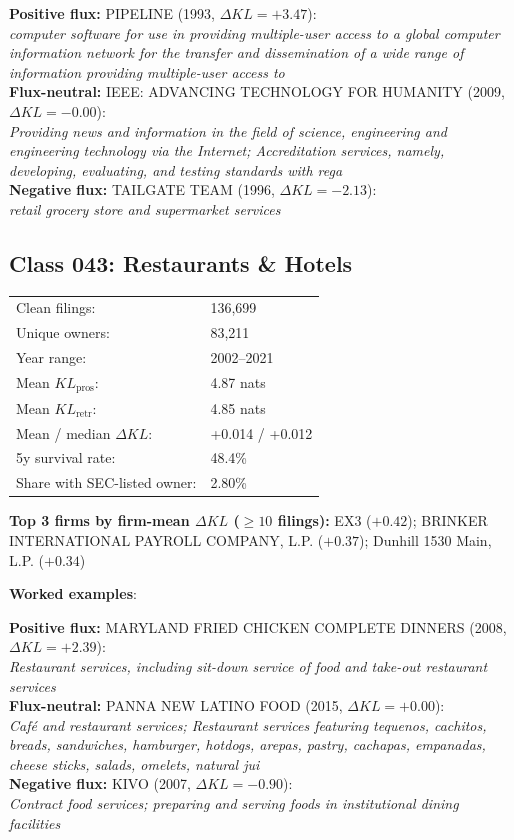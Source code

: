   \textbf{Positive flux:} \textsc{PIPELINE} (1993, $\Delta KL=+3.47$):\\
  \textit{computer software for use in providing multiple-user access to a global computer information network for the transfer and dissemination of a wide range of information providing multiple-user access to}\\
  \textbf{Flux-neutral:} \textsc{IEEE: ADVANCING TECHNOLOGY FOR HUMANITY} (2009, $\Delta KL=-0.00$):\\
  \textit{Providing news and information in the field of science, engineering and engineering technology via the Internet; Accreditation services, namely, developing, evaluating, and testing standards with rega}\\
  \textbf{Negative flux:} \textsc{TAILGATE TEAM} (1996, $\Delta KL=-2.13$):\\
  \textit{retail grocery store and supermarket services}\\

\subsection*{Class 043: Restaurants \& Hotels}
\label{app:industry-043}

\begin{tabular}{ll}
Clean filings: & 136,699 \\
Unique owners: & 83,211 \\
Year range: & 2002--2021 \\
Mean $KL_\text{pros}$: & 4.87 nats \\
Mean $KL_\text{retr}$: & 4.85 nats \\
Mean / median $\Delta KL$: & +0.014 / +0.012 \\
5y survival rate: & 48.4\% \\
Share with SEC-listed owner: & 2.80\% \\
\end{tabular}

\textbf{Top 3 firms by firm-mean $\Delta KL$ ($\geq 10$ filings):} EX3 ($+0.42$); BRINKER INTERNATIONAL PAYROLL COMPANY, L.P. ($+0.37$); Dunhill 1530 Main, L.P. ($+0.34$)

\textbf{Worked examples}:

  \textbf{Positive flux:} \textsc{MARYLAND FRIED CHICKEN COMPLETE DINNERS } (2008, $\Delta KL=+2.39$):\\
  \textit{Restaurant services, including sit-down service of food and take-out restaurant services}\\
  \textbf{Flux-neutral:} \textsc{PANNA NEW LATINO FOOD} (2015, $\Delta KL=+0.00$):\\
  \textit{Café and restaurant services; Restaurant services featuring tequenos, cachitos, breads, sandwiches, hamburger, hotdogs, arepas, pastry, cachapas, empanadas, cheese sticks, salads, omelets, natural jui}\\
  \textbf{Negative flux:} \textsc{KIVO} (2007, $\Delta KL=-0.90$):\\
  \textit{Contract food services; preparing and serving foods in institutional dining facilities}\\

